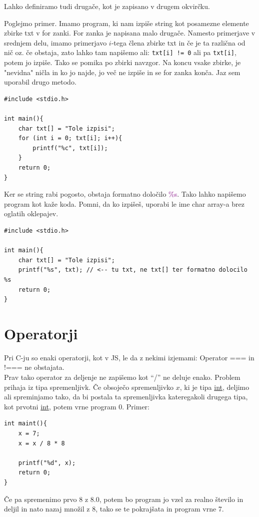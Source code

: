 \documentclass[a4paper, 12pt]{article}
\begin{document}
Lahko definiramo tudi drugače, kot je zapisano v drugem okvirčku.

Poglejmo primer. Imamo program, ki nam izpiše string kot posamezne elemente zbirke txt v for zanki. For zanka je napisana malo drugače. Namesto primerjave v srednjem delu, imamo primerjavo $i$-tega člena zbirke txt in če je ta različna od nič oz. če obstaja, zato lahko tam napišemo ali: \texttt{txt[i] != 0} ali pa \texttt{txt[i]}, potem jo izpiše. Tako se pomika po zbirki navzgor. Na koncu vsake zbirke, je "nevidna" ničla in ko jo najde, jo več ne izpiše in se for zanka konča. Jaz sem uporabil drugo metodo.

\begin{lstlisting}
#include <stdio.h>

int main(){
	char txt[] = "Tole izpisi";
	for (int i = 0; txt[i]; i++){
		printf("%c", txt[i]);
	}
	return 0;
}
\end{lstlisting}

Ker se string rabi pogosto, obstaja formatno določilo \textcolor{purple}{\%s}. Tako lahko napišemo program kot kaže koda. Pomni, da ko izpišeš, uporabi le ime char array-a brez oglatih oklepajev.

\begin{lstlisting}
#include <stdio.h>

int main(){
	char txt[] = "Tole izpisi";
	printf("%s", txt); // <-- tu txt, ne txt[] ter formatno dolocilo %s
	return 0;
}
\end{lstlisting}

\section{Operatorji}
Pri C-ju so enaki operatorji, kot v JS, le da z nekimi izjemami: Operator === in !=== ne obstajata.\\
Prav tako operator za deljenje ne zapišemo kot ``/'' ne deluje enako. Problem prihaja iz tipa spremenljivk. Če obsoječo spremenljivko $x$, ki je tipa \underline{int}, deljimo ali spreminjamo tako, da bi postala ta spremenljivka kateregakoli drugega tipa, kot prvotni \underline{int}, potem vrne program 0. Primer:
\begin{lstlisting}
int maint(){	
	x = 7;
	x = x / 8 * 8
	
	printf("%d", x);
	return 0;
}
\end{lstlisting}
Če pa spremenimo prvo 8 z 8.0, potem bo program jo vzel za realno število in deljil in nato nazaj množil z 8, tako se te pokrajšata in program vrne 7.
\end{document}
